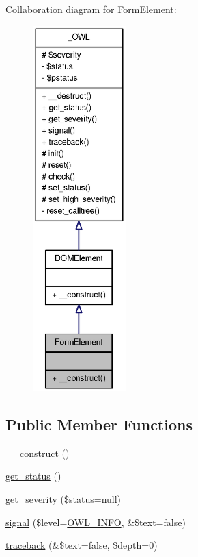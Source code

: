 Collaboration diagram for FormElement:\nopagebreak
\begin{figure}[H]
\begin{center}
\leavevmode
\includegraphics[height=400pt]{classFormElement__coll__graph}
\end{center}
\end{figure}
\subsection*{Public Member Functions}
\begin{DoxyCompactItemize}
\item 
\hyperlink{classFormElement_af5ecddb99f71fcd2a7b52b2dbcd4c4c5}{\_\-\_\-construct} ()
\item 
\hyperlink{class__OWL_a99ec771fa2c5c279f80152cc09e489a8}{get\_\-status} ()
\item 
\hyperlink{class__OWL_adf9509ef96858be7bdd9414c5ef129aa}{get\_\-severity} (\$status=null)
\item 
\hyperlink{class__OWL_a51ba4a16409acf2a2f61f286939091a5}{signal} (\$level=\hyperlink{owl_8severitycodes_8php_a139328861128689f2f4def6a399d9057}{OWL\_\-INFO}, \&\$text=false)
\item 
\hyperlink{class__OWL_aa29547995d6741b7d2b90c1d4ea99a13}{traceback} (\&\$text=false, \$depth=0)
\end{DoxyCompactItemize}
